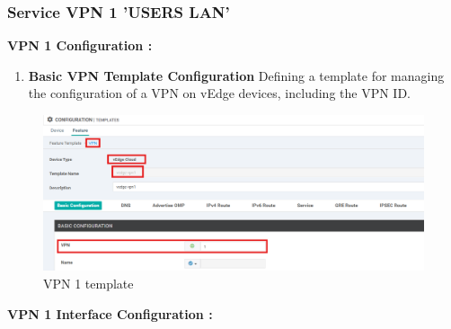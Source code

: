 \documentclass[12pt,english]{report}
\begin{document}
\subsubsection{Service VPN 1 'USERS LAN'}
\textbf{VPN 1 Configuration :}
\begin{enumerate}
\item \textbf{Basic VPN Template Configuration}
Defining a template for managing the configuration of a VPN on vEdge devices, including the VPN ID.
\end{enumerate}
\begin{figure}[H]
    \centering
    \includegraphics[width= 1 \textwidth]{chapitre 3/template/16.png}
    \caption{VPN 1 template}
    \label{VPN 1 template}
\end{figure}
\textbf{VPN 1 Interface Configuration :}
\end{document}
